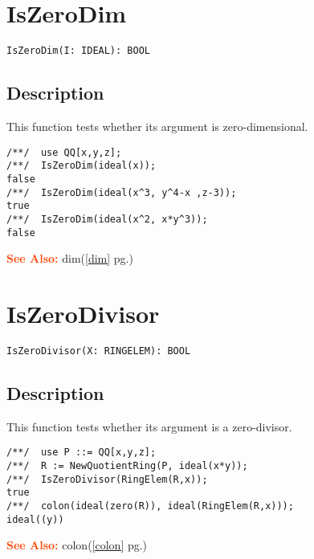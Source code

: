 \documentclass[a4paper]{mybook}
\newenvironment{command}{}{} %
\newcommand\SeeAlso{\par\textcolor{OrangeRed}{\textbf{\large See Also: }}}
\begin{document}
\section{IsZeroDim}
\label{IsZeroDim}
\begin{command} %


\begin{Verbatim}[label=syntax, rulecolor=\color{MidnightBlue},
frame=single]
IsZeroDim(I: IDEAL): BOOL
\end{Verbatim}


\subsection*{Description}

This function tests whether its argument is zero-dimensional.
\begin{Verbatim}[label=example, rulecolor=\color{PineGreen}, frame=single]
/**/  use QQ[x,y,z];
/**/  IsZeroDim(ideal(x));
false
/**/  IsZeroDim(ideal(x^3, y^4-x ,z-3));
true
/**/  IsZeroDim(ideal(x^2, x*y^3));
false
\end{Verbatim}


\SeeAlso %
  dim(\ref{dim} pg.\pageref{dim})
\end{command} %

\section{IsZeroDivisor}
\label{IsZeroDivisor}
\begin{command} %


\begin{Verbatim}[label=syntax, rulecolor=\color{MidnightBlue},
frame=single]
IsZeroDivisor(X: RINGELEM): BOOL
\end{Verbatim}


\subsection*{Description}

This function tests whether its argument is a zero-divisor.
\begin{Verbatim}[label=example, rulecolor=\color{PineGreen}, frame=single]
/**/  use P ::= QQ[x,y,z];
/**/  R := NewQuotientRing(P, ideal(x*y));
/**/  IsZeroDivisor(RingElem(R,x));
true
/**/  colon(ideal(zero(R)), ideal(RingElem(R,x)));
ideal((y))
\end{Verbatim}


\SeeAlso %
  colon(\ref{colon} pg.\pageref{colon})
\end{command} %
\end{document}
